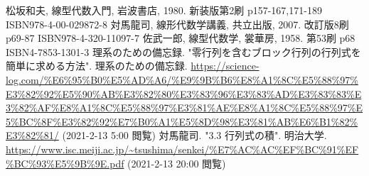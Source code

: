 \documentclass[dvipdfmx]{jsarticle}
\begin{document}
\begin{thebibliography}{50}
    松坂和夫, 線型代数入門, 岩波書店, 1980. 新装版第2刷 p157-167,171-189 ISBN978-4-00-029872-8
    対馬龍司, 線形代数学講義, 共立出版, 2007. 改訂版8刷 p69-87 ISBN978-4-320-11097-7
    佐武一郎, 線型代数学, 裳華房, 1958. 第53刷 p68 ISBN4-7853-1301-3
    理系のための備忘録. "零行列を含むブロック行列の行列式を簡単に求める方法". 理系のための備忘録. \url{https://science-log.com/%E6%95%B0%E5%AD%A6/%E9%9B%B6%E8%A1%8C%E5%88%97%E3%82%92%E5%90%AB%E3%82%80%E3%83%96%E3%83%AD%E3%83%83%E3%82%AF%E8%A1%8C%E5%88%97%E3%81%AE%E8%A1%8C%E5%88%97%E5%BC%8F%E3%82%92%E7%B0%A1%E5%8D%98%E3%81%AB%E6%B1%82%E3%82%81/} (2021-2-13 5:00 閲覧)
    対馬龍司. "3.3 行列式の積". 明治大学. \url{https://www.isc.meiji.ac.jp/~tsushima/senkei/%E7%AC%AC%EF%BC%91%EF%BC%93%E5%9B%9E.pdf} (2021-2-13 20:00 閲覧)
  \end{thebibliography}
\end{document}
